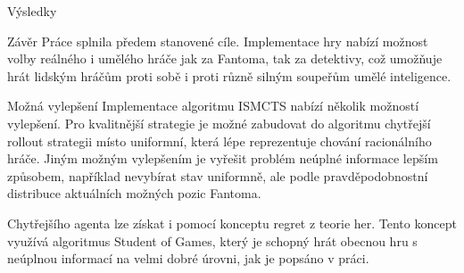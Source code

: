 \documentclass[portrait,a0paper,fontscale=0.25]{baposter}
\begin{document}
\begin{poster}
\begin{posterbox}[column=1, name=result1]{Výsledky}
\end{posterbox}

\begin{posterbox}[column=1, name=result2, below=result1]{Závěr}
Práce splnila předem stanovené cíle. Implementace hry nabízí možnost volby reálného i umělého hráče jak za Fantoma, tak za detektivy, což umožňuje hrát lidským hráčům proti sobě i proti různě silným soupeřům umělé inteligence.
\end{posterbox}

\begin{posterbox}[column=1, name=result3, below=result2]{Možná vylepšení}
Implementace algoritmu ISMCTS nabízí několik možností vylepšení. Pro kvalitnější strategie je možné zabudovat do algoritmu chytřejší rollout strategii místo uniformní, která lépe reprezentuje chování racionálního hráče. Jiným možným vylepšením je vyřešit problém neúplné informace lepším způsobem, například nevybírat stav uniformně, ale podle pravděpodobnostní distribuce aktuálních možných pozic Fantoma.

Chytřejšího agenta lze získat i pomocí konceptu regret z teorie her. Tento koncept využívá algoritmus Student of Games, který je schopný hrát obecnou hru s neúplnou informací na velmi dobré úrovni, jak je popsáno v práci.
\end{posterbox}



\end{poster}
\end{document}
